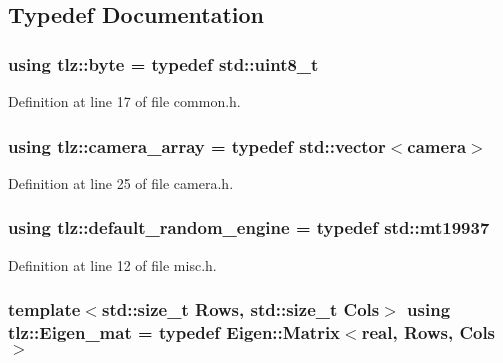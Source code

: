 \subsection{Typedef Documentation}
\subsubsection[{\texorpdfstring{byte}{byte}}]{\setlength{\rightskip}{0pt plus 5cm}using {\bf tlz\+::byte} = typedef std\+::uint8\+\_\+t}\hypertarget{namespacetlz_afbec730d64767e794a689352d41b2b18}{}\label{namespacetlz_afbec730d64767e794a689352d41b2b18}


Definition at line 17 of file common.\+h.

\subsubsection[{\texorpdfstring{camera\+\_\+array}{camera_array}}]{\setlength{\rightskip}{0pt plus 5cm}using {\bf tlz\+::camera\+\_\+array} = typedef std\+::vector$<${\bf camera}$>$}\hypertarget{namespacetlz_a7c35ad93fe55f736afafa798f3885c8e}{}\label{namespacetlz_a7c35ad93fe55f736afafa798f3885c8e}


Definition at line 25 of file camera.\+h.

\subsubsection[{\texorpdfstring{default\+\_\+random\+\_\+engine}{default_random_engine}}]{\setlength{\rightskip}{0pt plus 5cm}using {\bf tlz\+::default\+\_\+random\+\_\+engine} = typedef std\+::mt19937}\hypertarget{namespacetlz_ac874ea3afd9982e4ba55013615f44871}{}\label{namespacetlz_ac874ea3afd9982e4ba55013615f44871}


Definition at line 12 of file misc.\+h.

\subsubsection[{\texorpdfstring{Eigen\+\_\+mat}{Eigen_mat}}]{\setlength{\rightskip}{0pt plus 5cm}template$<$std\+::size\+\_\+t Rows, std\+::size\+\_\+t Cols$>$ using {\bf tlz\+::\+Eigen\+\_\+mat} = typedef Eigen\+::\+Matrix$<${\bf real}, Rows, Cols$>$}\hypertarget{namespacetlz_a524ba0d1429b56ff27b8f86c218f9dff}{}\label{namespacetlz_a524ba0d1429b56ff27b8f86c218f9dff}



